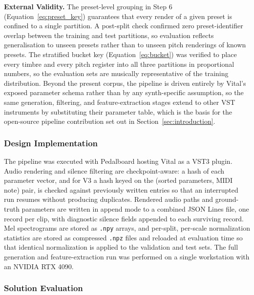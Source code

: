 \par \vspace{0.3cm}
\noindent\textbf{External Validity.} The preset-level grouping in Step 6 (Equation~\ref{eq:preset_key}) guarantees that every render of a given preset is confined to a single partition. A post-split check confirmed zero preset-identifier overlap between the training and test partitions, so evaluation reflects generalisation to unseen presets rather than to unseen pitch renderings of known presets. The stratified bucket key (Equation~\ref{eq:bucket}) was verified to place every timbre and every pitch register into all three partitions in proportional numbers, so the evaluation sets are musically representative of the training distribution. Beyond the present corpus, the pipeline is driven entirely by Vital's exposed parameter schema rather than by any synth-specific assumption, so the same generation, filtering, and feature-extraction stages extend to other VST instruments by substituting their parameter table, which is the basis for the open-source pipeline contribution set out in Section~\ref{sec:introduction}.

\subsubsection{Design Implementation}

\noindent
The pipeline was executed with Pedalboard hosting Vital as a VST3 plugin. Audio rendering and silence filtering are checkpoint-aware: a hash of each parameter vector, and for V3 a hash keyed on the (sorted parameters, MIDI note) pair, is checked against previously written entries so that an interrupted run resumes without producing duplicates. Rendered audio paths and ground-truth parameters are written in append mode to a combined JSON Lines file, one record per clip, with diagnostic silence fields appended to each surviving record. Mel spectrograms are stored as \texttt{.npy} arrays, and per-split, per-scale normalization statistics are stored as compressed \texttt{.npz} files and reloaded at evaluation time so that identical normalization is applied to the validation and test sets. The full generation and feature-extraction run was performed on a single workstation with an NVIDIA RTX 4090.

\subsubsection{Solution Evaluation}

